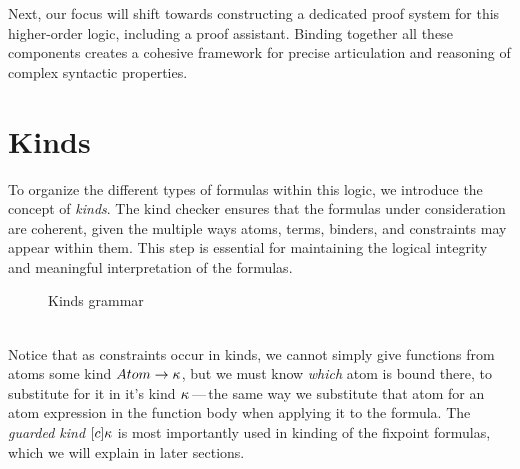 \documentclass[english, mgr]{iithesis}
\renewcommand{\it}[1]{\textit{#1}}
\newcommand{\mdash}{\,---\,}
\def\-{{\mdash}}
\begin{document}
Next, our focus will shift towards constructing a dedicated proof system for this higher-order logic, including a proof assistant.
Binding together all these components creates a cohesive framework
for precise articulation and reasoning of complex syntactic properties.

\section{Kinds}
To organize the different types of formulas within this logic, we introduce the concept of \it{kinds}.
The kind checker ensures that the formulas under consideration are coherent, given the multiple ways atoms, terms, binders, and constraints may appear within them. This step is essential for maintaining the logical integrity and meaningful interpretation of the formulas.
\begin{figure}[htbp]
  \caption{Kinds grammar}
  \label{fig:kinds-grammar}
\end{figure}
\\
Notice that as constraints occur in kinds, we cannot simply give functions
from atoms some kind ${Atom}\to\kappa$, but we must know \it{which} atom
is bound there, to substitute for it in it's kind $\kappa$\-the same way we substitute
that atom for an atom expression in the function body when applying it to the formula.
The \it{guarded kind} $[c] \kappa$ is most importantly used in
kinding of the fixpoint formulas, which we will explain in later sections.
\end{document}
